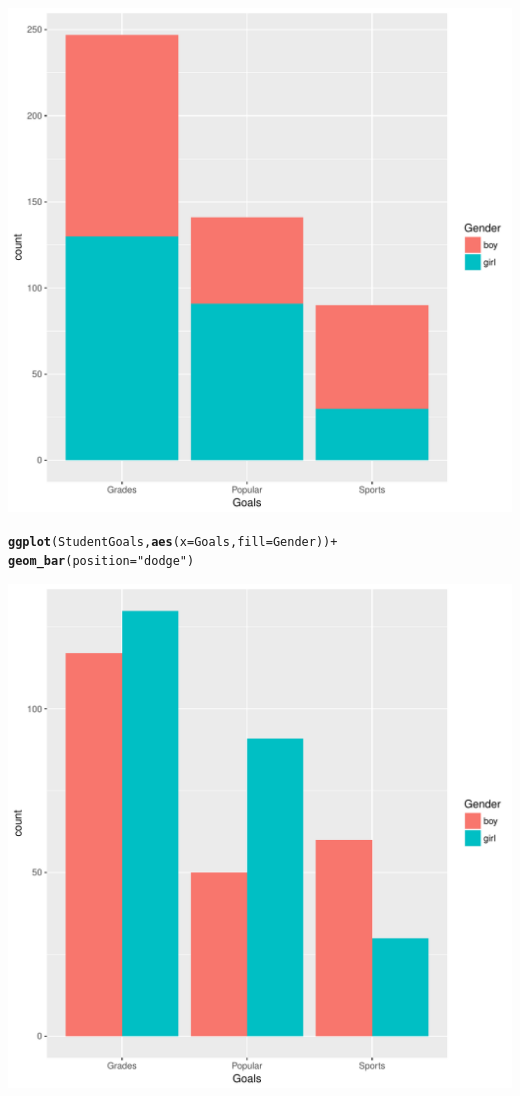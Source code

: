 \documentclass[12pt,oneside]{book}\usepackage[]{graphicx}\usepackage[]{color}
\makeatletter
\def\maxwidth{ %
  \ifdim\Gin@nat@width>\linewidth
    \linewidth
  \else
    \Gin@nat@width
  \fi
}
\newcommand{\hlstr}[1]{\textcolor[rgb]{0.192,0.494,0.8}{#1}}%
\newcommand{\hlopt}[1]{\textcolor[rgb]{0,0,0}{#1}}%
\newcommand{\hlstd}[1]{\textcolor[rgb]{0.345,0.345,0.345}{#1}}%
\newcommand{\hlkwc}[1]{\textcolor[rgb]{0.333,0.667,0.333}{#1}}%
\newcommand{\hlkwd}[1]{\textcolor[rgb]{0.737,0.353,0.396}{\textbf{#1}}}%
\newenvironment{kframe}{%
 \def\at@end@of@kframe{}%
 \ifinner\ifhmode%
  \def\at@end@of@kframe{\end{minipage}}%
  \begin{minipage}{\columnwidth}%
 \fi\fi%
 \def\FrameCommand##1{\hskip\@totalleftmargin \hskip-\fboxsep
 \colorbox{shadecolor}{##1}\hskip-\fboxsep
     \hskip-\linewidth \hskip-\@totalleftmargin \hskip\columnwidth}%
 \MakeFramed {\advance\hsize-\width
   \@totalleftmargin\z@ \linewidth\hsize
   \@setminipage}}%
 {\par\unskip\endMakeFramed%
 \at@end@of@kframe}
\newenvironment{knitrout}{}{} %
\makeatother
\begin{document}
\begin{knitrout}
\includegraphics[width=\maxwidth]{figure/unnamed-chunk-81-2} 
\begin{kframe}\begin{alltt}
\hlkwd{ggplot}\hlstd{(StudentGoals,} \hlkwd{aes}\hlstd{(}\hlkwc{x} \hlstd{= Goals,} \hlkwc{fill} \hlstd{= Gender))} \hlopt{+}
    \hlkwd{geom_bar}\hlstd{(}\hlkwc{position} \hlstd{=} \hlstr{"dodge"}\hlstd{)}
\end{alltt}
\end{kframe}
\includegraphics[width=\maxwidth]{figure/unnamed-chunk-81-3} 

\end{knitrout}
\end{document}
